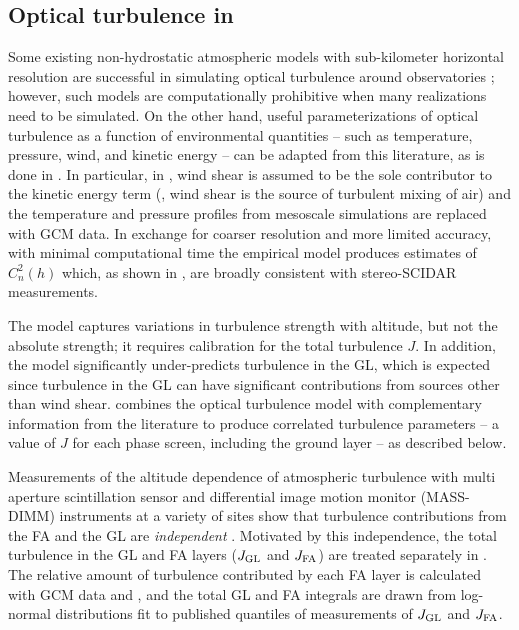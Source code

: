 \documentclass[twocolumn,twocolappendix]{openjournal}
\begin{document}
\subsection{Optical turbulence in \psfws}\label{sec:psfwsturb}
Some existing non-hydrostatic atmospheric models with sub-kilometer horizontal resolution are successful in simulating optical turbulence around observatories \citep{masciadri_3D_2001, masciadri_optical_2017}; however, such models are computationally prohibitive when many realizations need to be simulated. 
On the other hand, useful parameterizations of optical turbulence as a function of environmental quantities -- such as temperature, pressure, wind, and kinetic energy -- can be adapted from this literature, as is done in \osborn \citep{osborn_optical_2018}.
In particular, in \osborn,  wind shear is assumed to be the sole contributor to the kinetic energy term (\ie, wind shear is the source of turbulent mixing of air) and the temperature and pressure profiles from mesoscale simulations are replaced with GCM data.
In exchange for coarser resolution and more limited accuracy, with minimal computational time the \osborn empirical model produces estimates of $C_n^2(h)$ which, as shown in \osborn, are broadly consistent with stereo-SCIDAR measurements. 

The \osborn model captures variations in turbulence strength with altitude, but not the absolute strength; it requires calibration for the total turbulence $J$.
In addition, the \osborn model significantly under-predicts turbulence in the GL, which is expected since turbulence in the GL can have significant contributions from sources other than wind shear.
\psfws combines the \osborn optical turbulence model with complementary information from the literature to produce correlated turbulence parameters -- a value of $J$ for each phase screen, including the ground layer -- as described below.

Measurements of the altitude dependence of atmospheric turbulence with multi aperture scintillation sensor and differential image motion monitor (MASS-DIMM) instruments
at a variety of sites show that turbulence contributions from the FA and the GL are \textit{independent} \citep{tokovinin_model_2005, tokovinin_optical_2005, chun_mauna_2009}.
Motivated by this independence, the total turbulence in the GL and FA layers ($J_{\rm GL}$ and $J_{\rm FA}$) are treated separately in \psfws.
The relative amount of turbulence contributed by each FA layer is calculated with GCM data and \osborn, and the total GL and FA integrals are drawn from log-normal distributions fit to published quantiles of measurements of $J_{\rm GL}$ and $J_{\rm FA}$.
\end{document}

